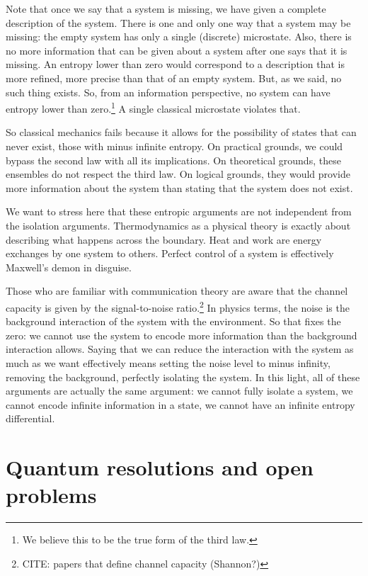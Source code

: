 \documentclass[10pt,twocolumn, nofootinbib]{revtex4-2}
\begin{document}
Note that once we say that a system is missing, we have given a complete description of the system. There is one and only one way that a system may be missing: the empty system has only a single (discrete) microstate. Also, there is no more information that can be given about a system after one says that it is missing. An entropy lower than zero would correspond to a description that is more refined, more precise than that of an empty system. But, as we said, no such thing exists. So, from an information perspective, no system can have entropy lower than zero.\footnote{We believe this to be the true form of the third law.} A single classical microstate violates that.

So classical mechanics fails because it allows for the possibility of states that can never exist, those with minus infinite entropy. On practical grounds, we could bypass the second law with all its implications. On theoretical grounds, these ensembles do not respect the third law. On logical grounds, they would provide more information about the system than stating that the system does not exist.

We want to stress here that these entropic arguments are not independent from the isolation arguments. Thermodynamics as a physical theory is exactly about describing what happens across the boundary. Heat and work are energy exchanges by one system to others. Perfect control of a system is effectively Maxwell’s demon in disguise.

Those who are familiar with communication theory are aware that the channel capacity is given by the signal-to-noise ratio.\footnote{CITE: papers that define channel capacity (Shannon?)} In physics terms, the noise is the background interaction of the system with the environment. So that fixes the zero: we cannot use the system to encode more information than the background interaction allows. Saying that we can reduce the interaction with the system as much as we want effectively means setting the noise level to minus infinity, removing the background, perfectly isolating the system. In this light, all of these arguments are actually the same argument: we cannot fully isolate a system, we cannot encode infinite information in a state, we cannot have an infinite entropy differential.

\section{Quantum resolutions and open problems}
\end{document}
